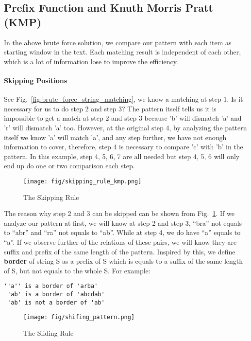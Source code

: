 \documentclass[../main.tex]{subfiles}
\begin{document}
\subsection{Prefix Function and Knuth Morris Pratt (KMP)}
\label{pattern_matching_subsec_kmp}
In the above brute force solution, we compare our pattern with each item as starting window in the text. Each matching result is independent of each other, which is a lot of information lose to improve the efficiency. 

\paragraph{Skipping Positions} See Fig.~\ref{fig:brute_force_string_matching}, we know a matching at step 1. Is it necessary for us to do step 2 and step 3? The pattern itself tells us it is impossible to get a match at step 2 and step 3 because 'b' will dismatch 'a' and 'r' will dismatch 'a' too. However, at the original step 4, by analyzing the pattern itself we know 'a' will match 'a', and any step further, we have not enough information to cover, therefore, step 4 is necessary to compare 'c' with 'b' in the pattern. In this example, step 4, 5, 6, 7 are all needed but step 4, 5, 6 will only end up do one or two comparison each step. 

\begin{figure}[h]
    \centering
    \texttt{[image: fig/skipping\_rule\_kmp.png]}
    \caption{The Skipping Rule}
    \label{fig:skipping_rule_kmp}
\end{figure}

 The reason why step 2 and 3 can be skipped can be shown from Fig.~\ref{fig:skipping_rule_kmp}. If we analyze our pattern at first, we will know at step 2 and step 3, ``bra'' not equals to ``abr'' and ``ra'' not equals to ``ab''. While at step 4, we do have ``a'' equals to ``a''. If we observe further of the relations of these pairs, we will know they are suffix and prefix of the same length of the pattern. Inspired by this, we define \textbf{border} of string S as a prefix of S which is equals to a suffix of the same length of S, but not equals to the whole S. For example:
 \begin{lstlisting}[numbers=none]
 ''a'' is a border of 'arba'
 'ab' is a border of 'abcdab'
 'ab' is not a border of 'ab'
 \end{lstlisting}
 
\begin{figure}[h]
    \centering
    \texttt{[image: fig/shifing\_pattern.png]}
    \caption{The Sliding Rule}
    \label{fig:sliding_rule_kmp}
\end{figure}
\end{document}
